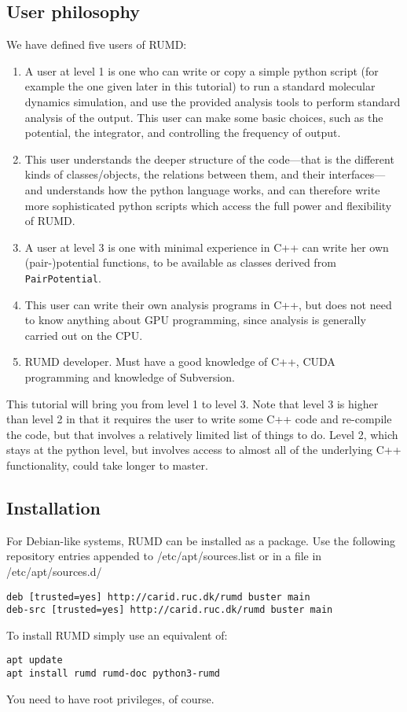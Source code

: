 \subsection{User philosophy}
We have defined five users of RUMD:
\begin{enumerate}
\item A user at level 1 is one who can write or copy a simple python script
(for example the one given later in this tutorial) to run a standard molecular 
dynamics simulation, and use the provided analysis tools to perform standard
analysis of the output. This user can make some basic choices, such as the
potential, the integrator, and controlling the frequency of output.
\item This user understands the deeper structure of the code---that is
the different kinds of classes/objects, the relations between them, and their 
interfaces---and understands how the python language works, and can therefore 
write more sophisticated python scripts which
access the full power and flexibility of RUMD.
\item A user at level 3 is one with minimal experience in C++ can write
her own (pair-)potential functions, to be available as classes derived from
\verb|PairPotential|.
\item This user can write their own analysis programs in C++, but does not
need to know anything about GPU programming, since analysis is generally
carried out on the CPU.
\item RUMD developer. Must have a good knowledge of C++, CUDA programming
and knowledge of Subversion.
\end{enumerate}
This tutorial will bring you from level 1 to level 3. Note that level 3 is
higher than level 2 in that it requires the user to write some C++ code and
re-compile the code, but that involves a relatively limited list of things to 
do. Level 2, which stays at the python level, but involves access to almost all of 
the underlying C++ functionality, could take longer to master.


\subsection{Installation}
For Debian-like systems, RUMD can be installed as a package. 
Use the following repository entries appended to 
\textsf{/etc/apt/sources.list} 
or in a file in \textsf{/etc/apt/sources.d/} 
\begin{verbatim}
deb [trusted=yes] http://carid.ruc.dk/rumd buster main
deb-src [trusted=yes] http://carid.ruc.dk/rumd buster main
\end{verbatim}
To install RUMD simply use an equivalent of:
\begin{verbatim}
apt update
apt install rumd rumd-doc python3-rumd
\end{verbatim}
You need to have root privileges, of course. 

